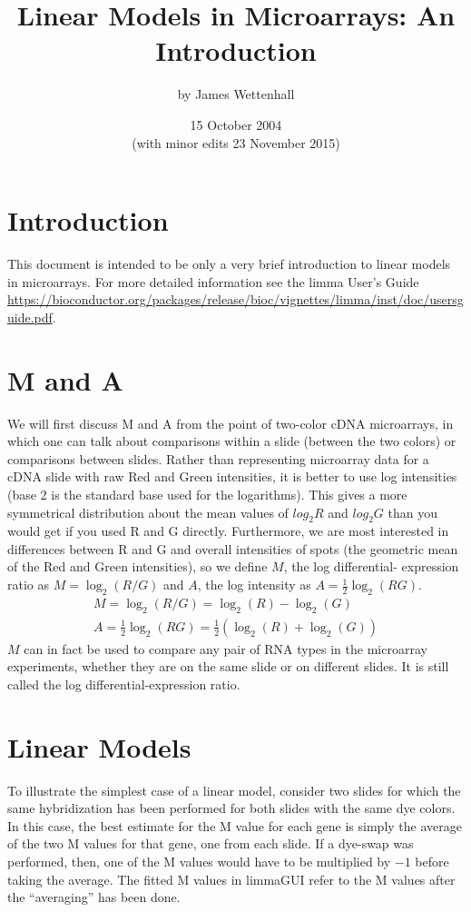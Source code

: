 \documentclass[a4paper,11pt]{article}
\begin{document}
\title{Linear Models in Microarrays: An Introduction}
\author{by James Wettenhall}
\date{15 October 2004\\
(with minor edits 23 November 2015)}
\maketitle
\section{Introduction}
This document is intended to be only a very brief introduction to linear models in microarrays.  For more detailed
information see the limma User's Guide
\url{https://bioconductor.org/packages/release/bioc/vignettes/limma/inst/doc/usersguide.pdf}.

\section{M and A}
We will first discuss M and A from the point of two-color cDNA microarrays, in which one can talk about comparisons
within a slide (between the two colors) or comparisons between slides.  Rather than representing microarray data for
a cDNA slide with raw Red and Green intensities, it is better to use log intensities (base 2 is the standard base used
for the logarithms).  This gives a more symmetrical distribution about the mean values of $log_{2}R$ and $log_{2}G$ than 
you would get if you used R and G directly.  Furthermore, we are most interested in differences between R and G and
overall intensities of spots (the geometric mean of the Red and Green intensities), so we define $M$, the log differential- 
expression ratio as $M=\log_2(R/G)$ and $A$, the log intensity as $A=\frac{1}{2} \log_2(RG)$. \\
\begin{eqnarray*}
M=\log_2(R/G) = \log_2(R) - \log_2(G) \\
A=\frac{1}{2} \log_2(RG) = \frac{1}{2} (\log_2(R) + \log_2(G))
\end{eqnarray*}
$M$ can in fact be used to compare any pair of RNA types in the microarray experiments, whether they
are on the same slide or on different slides.  It is still called the log differential-expression
ratio.

\section{Linear Models}
To illustrate the simplest case of a linear model, consider two slides for which the same hybridization has been
performed for both slides with the same dye colors.  In this case, the best estimate for the M value for each
gene is simply the average of the two M values for that gene, one from each slide.  If a dye-swap was performed,
then, one of the M values would have to be multiplied by $-1$ before taking the average.  The fitted M values
in limmaGUI refer to the M values after the ``averaging'' has been done.
\end{document}
